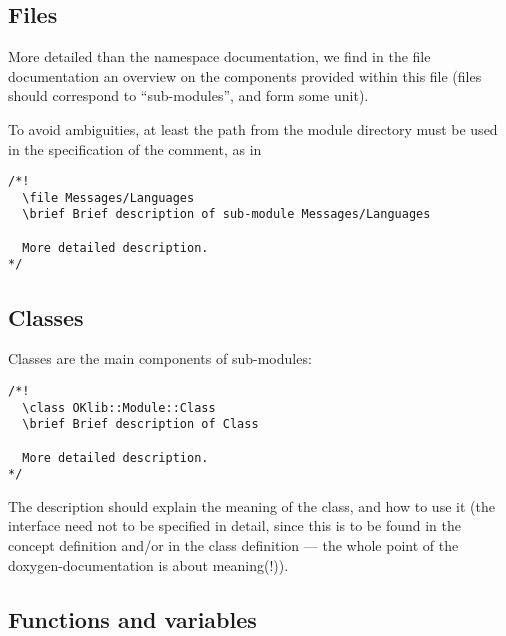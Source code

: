 \documentclass{book}
\begin{document}
\subsection{Files}
\label{sec:FilesDox}

More detailed than the namespace documentation, we find in the file documentation an overview on the components provided within this file (files should correspond to ``sub-modules'', and form some unit).

To avoid ambiguities, at least the path from the module directory must be used in the specification of the comment, as in
\begin{verbatim}
/*!
  \file Messages/Languages
  \brief Brief description of sub-module Messages/Languages

  More detailed description.
*/
\end{verbatim}


\subsection{Classes}
\label{sec:ClassDox}

Classes are the main components of sub-modules:
\begin{verbatim}
/*!
  \class OKlib::Module::Class
  \brief Brief description of Class

  More detailed description.
*/
\end{verbatim}
The description should explain the meaning of the class, and how to use it (the interface need not to be specified in detail, since this is to be found in the concept definition and/or in the class definition --- the whole point of the doxygen-documentation is about meaning(!)).


\subsection{Functions and variables}
\label{sec:GlobalFuncDox}
\end{document}
